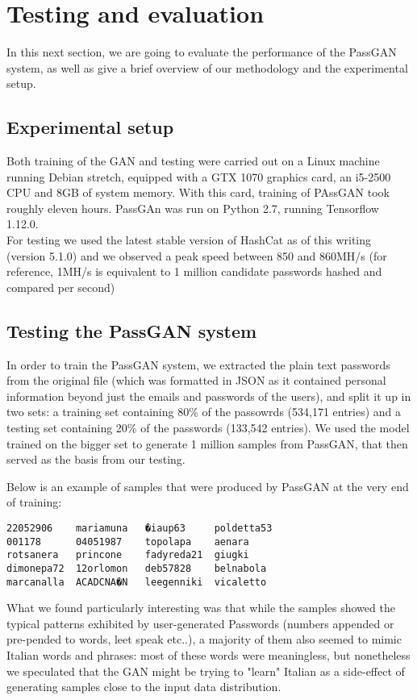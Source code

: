 \section{Testing and evaluation}
In this next section, we are going to evaluate the performance of the PassGAN system, as well as give a brief overview of our methodology and the experimental setup.

\subsection{Experimental setup}
Both training of the GAN and testing were carried out on a Linux machine running Debian stretch, equipped with a GTX 1070 graphics card, an i5-2500 CPU and 8GB of system memory. 
With this card, training of PAssGAN took roughly eleven hours.
PassGAn was run on Python 2.7, running Tensorflow 1.12.0.\\
For testing we used the latest stable version of HashCat as of this writing (version 5.1.0) and we observed a peak speed between 850 and 860MH/s (for reference, 1MH/s is equivalent to 1 million candidate passwords hashed and compared per second) %

\subsection{Testing the PassGAN system}
In order to train the PassGAN system, we extracted the plain text passwords from the original file (which was formatted in JSON as it contained personal information beyond just the emails and passwords of the users), and split it up in two sets: a training set containing 80\% of the passowrds (534,171 entries) and a testing set containing 20\% of the passwords (133,542 entries).
We used the model trained on the bigger set to generate 1 million samples from PassGAN, that then served as the basis from our testing.

Below is an example of samples that were produced by PassGAN at the very end of training: %
\begin{verbatim}
22052906    mariamuna   �iaup63     poldetta53
001178      04051987    topolapa    aenara
rotsanera   princone    fadyreda21  giugki
dimonepa72  12orlomon   deb57828    belnabola
marcanalla  ACADCNA�N   leegenniki  vicaletto
\end{verbatim}

What we found particularly interesting was that while the samples showed the typical patterns exhibited by user-generated Passwords (numbers appended or pre-pended to words, leet speak etc..), a majority of them also seemed to mimic Italian words and phrases: most of these words were meaningless, but nonetheless we speculated that the GAN might be trying to "learn" Italian as a side-effect of generating samples close to the input data distribution.


